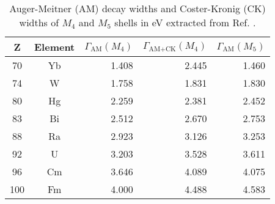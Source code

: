 \begin{table}[h]
 \caption{Auger-Meitner (AM) decay widths and Coster-Kronig (CK) widths
          of $M_4$ and $M_5$ shells
          in \unit{eV} extracted from
          Ref. \cite{Chen80}.}
 \begin{tabular}{ccrrr}
 \toprule
 Z & Element & $\Gamma_\text{AM}(M_4)$ & $\Gamma_\text{AM+CK}(M_4)$ & $\Gamma_\text{AM}(M_5)$\\
 \midrule
 70 & Yb & 1.408 & 2.445 & 1.460 \\
 74 & W  & 1.758 & 1.831 & 1.830 \\
 80 & Hg & 2.259 & 2.381 & 2.452 \\
 83 & Bi & 2.512 & 2.670 & 2.753 \\
 88 & Ra & 2.923 & 3.126 & 3.253 \\
 92 & U  & 3.203 & 3.528 & 3.611 \\
 96 & Cm & 3.646 & 4.089 & 4.075 \\
100 & Fm & 4.000 & 4.488 & 4.583 \\
 \bottomrule
 \end{tabular}
 \label{tab:M45}
\end{table}

